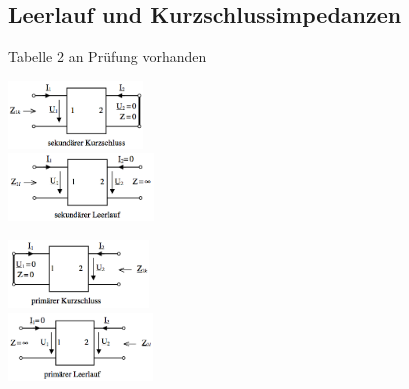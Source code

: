 \begin{multicols}{2}
\subsection{Leerlauf und Kurzschlussimpedanzen}
	Tabelle 2 an Prüfung vorhanden\\
		\begin{minipage}{4cm}
	    	\includegraphics[height=1.8cm]{./bilder/sekKurzschluss}\\
			\includegraphics[height=1.8cm]{./bilder/sekLeerlauf}
	    \end{minipage}
		\begin{minipage}{4cm}
	    	\includegraphics[height=1.8cm]{./bilder/primKurzschluss}\\
			\includegraphics[height=1.8cm]{./bilder/primLeerlauf}
	    \end{minipage}
\end{multicols}

